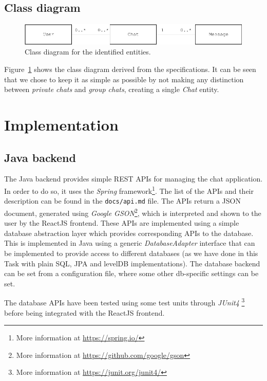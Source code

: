 \documentclass[10pt]{article}
\begin{document}
\subsection{Class diagram}
\begin{figure}[h!]
    \centering
    \includegraphics[width=\textwidth]{figs/class_diagram}
    \caption{Class diagram for the identified entities.}
    \label{fig:class_diagram}
\end{figure}

Figure~\ref{fig:class_diagram} shows the class diagram derived from the specifications. 
It can be seen that we chose to keep it as simple as possible by not making  
any distinction between \emph{private chats} and \emph{group chats}, 
creating a single \emph{Chat} entity.

\clearpage
\section{Implementation}

\subsection{Java backend}
The Java backend provides simple REST APIs for managing the chat application. 
In order to do so, it uses the \emph{Spring} framework\footnote{More information
at \url{https://spring.io/}}.
The list of the APIs and their description can be found in the 
\texttt{docs/api.md} file. The APIs return a JSON document, generated using
\emph{Google GSON}\footnote{More information at 
\url{https://github.com/google/gson}}, which is interpreted and shown to the user
by the ReactJS frontend.
These APIs are implemented using a simple database abstraction layer which provides 
corresponding APIs to the database. This is implemented in Java 
using a generic \emph{DatabaseAdapter} interface that can be implemented to 
provide access to different databases (as we have done in this Task with plain SQL, 
JPA and levelDB implementations). The database backend can be set from a configuration
file, where some other db-specific settings can be set.

The database APIs have been tested using some test units through \emph{JUnit4}
\footnote{More information at \url{https://junit.org/junit4/}} before being 
integrated with the ReactJS frontend.
\end{document}
